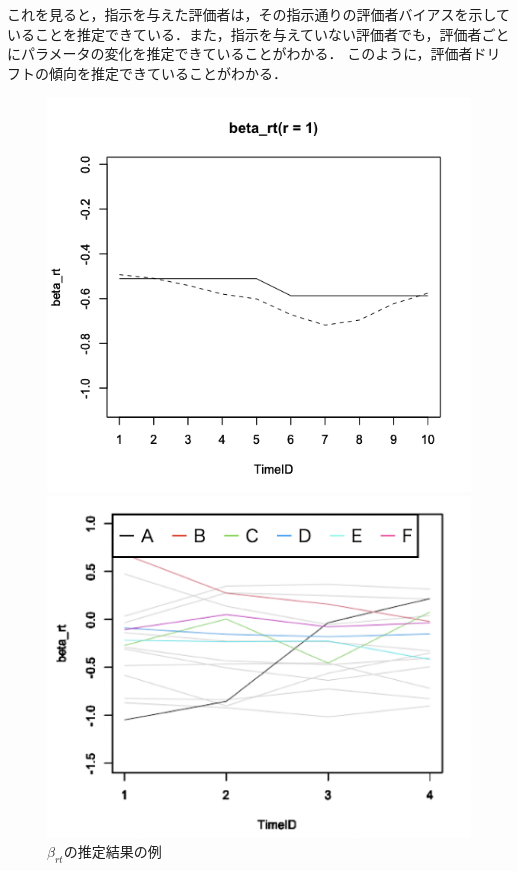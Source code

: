 \documentclass[dvipdfmx, twocolumn, a4paper]{hcresume}
\begin{document}
これを見ると，指示を与えた評価者は，その指示通りの評価者バイアスを示していることを推定できている．また，指示を与えていない評価者でも，評価者ごとにパラメータの変化を推定できていることがわかる．
このように，評価者ドリフトの傾向を推定できていることがわかる．
\begin{figure}[t]
  \begin{minipage}[b]{4cm}
    \includegraphics[keepaspectratio, scale=0.22]{img/beta_rt_param_1.png}
  \end{minipage}
  \begin{minipage}[b]{4cm}
    \includegraphics[keepaspectratio, scale=0.28]{img/data_img2.png}
  \end{minipage}
  \caption{$\beta_{rt}$の推定結果の例}
  \label{beta_rt_data}
  \vspace*{0.5cm}
\end{figure}
\end{document}
